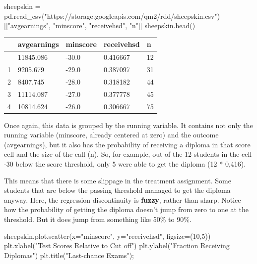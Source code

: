 \documentclass[
  letterpaper,
  DIV=11,
  numbers=noendperiod]{scrreprt}
\newenvironment{Shaded}{\begin{snugshade}}{\end{snugshade}}
\newcommand{\DecValTok}[1]{\textcolor[rgb]{0.68,0.00,0.00}{#1}}
\newcommand{\NormalTok}[1]{\textcolor[rgb]{0.00,0.23,0.31}{#1}}
\newcommand{\OperatorTok}[1]{\textcolor[rgb]{0.37,0.37,0.37}{#1}}
\newcommand{\StringTok}[1]{\textcolor[rgb]{0.13,0.47,0.30}{#1}}
\begin{document}
\begin{Shaded}
\begin{Highlighting}[]
\NormalTok{sheepskin }\OperatorTok{=}\NormalTok{ pd.read\_csv(}\StringTok{"https://storage.googleapis.com/qm2/rdd/sheepskin.csv"}\NormalTok{)[[}\StringTok{"avgearnings"}\NormalTok{, }\StringTok{"minscore"}\NormalTok{, }\StringTok{"receivehsd"}\NormalTok{, }\StringTok{"n"}\NormalTok{]]}
\NormalTok{sheepskin.head()}
\end{Highlighting}
\end{Shaded}

\begin{longtable}[]{@{}lllll@{}}
\toprule\noalign{}
& avgearnings & minscore & receivehsd & n \\
\midrule\noalign{}
\endhead
\bottomrule\noalign{}
\endlastfoot
0 & 11845.086 & -30.0 & 0.416667 & 12 \\
1 & 9205.679 & -29.0 & 0.387097 & 31 \\
2 & 8407.745 & -28.0 & 0.318182 & 44 \\
3 & 11114.087 & -27.0 & 0.377778 & 45 \\
4 & 10814.624 & -26.0 & 0.306667 & 75 \\
\end{longtable}

Once again, this data is grouped by the running variable. It contains
not only the running variable (minscore, already centered at zero) and
the outcome (avgearnings), but it also has the probability of receiving
a diploma in that score cell and the size of the call (n). So, for
example, out of the 12 students in the cell -30 below the score
threshold, only 5 were able to get the diploma (12 * 0,416).

This means that there is some slippage in the treatment assignment. Some
students that are below the passing threshold managed to get the diploma
anyway. Here, the regression discontinuity is \textbf{fuzzy}, rather
than sharp. Notice how the probability of getting the diploma doesn't
jump from zero to one at the threshold. But it does jump from something
like 50\% to 90\%.

\begin{Shaded}
\begin{Highlighting}[]
\NormalTok{sheepskin.plot.scatter(x}\OperatorTok{=}\StringTok{"minscore"}\NormalTok{, y}\OperatorTok{=}\StringTok{"receivehsd"}\NormalTok{, figsize}\OperatorTok{=}\NormalTok{(}\DecValTok{10}\NormalTok{,}\DecValTok{5}\NormalTok{))}
\NormalTok{plt.xlabel(}\StringTok{"Test Scores Relative to Cut off"}\NormalTok{)}
\NormalTok{plt.ylabel(}\StringTok{"Fraction Receiving Diplomas"}\NormalTok{)}
\NormalTok{plt.title(}\StringTok{"Last{-}chance Exams"}\NormalTok{)}\OperatorTok{;}
\end{Highlighting}
\end{Shaded}
\end{document}
